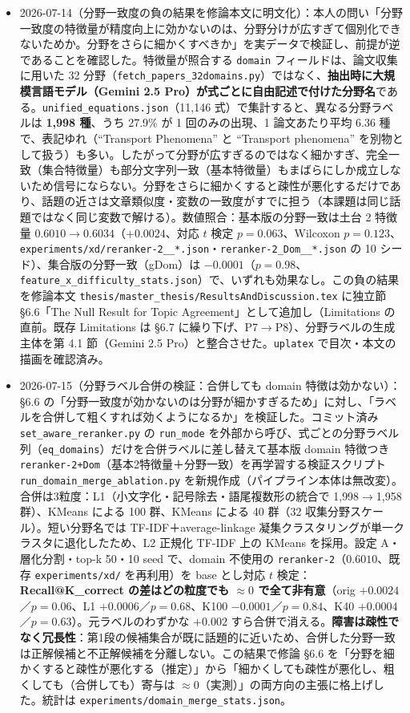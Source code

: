 \documentclass[11pt,a4paper]{jsarticle}
\begin{document}
\begin{itemize}[nosep]
  \item 2026-07-14（分野一致度の負の結果を修論本文に明文化）：本人の問い「分野一致度の特徴量が精度向上に効かないのは、分野分けが広すぎて個別化できないためか。分野をさらに細かくすべきか」を実データで検証し、前提が逆であることを確認した。特徴量が照合する \texttt{domain} フィールドは、論文収集に用いた 32 分野（\texttt{fetch\_papers\_32domains.py}）ではなく、\textbf{抽出時に大規模言語モデル（Gemini 2.5 Pro）が式ごとに自由記述で付けた分野名}である。\texttt{unified\_equations.json}（11{,}146 式）で集計すると、異なる分野ラベルは \textbf{1{,}998 種}、うち 27.9\% が 1 回のみの出現、1 論文あたり平均 6.36 種で、表記ゆれ（``Transport Phenomena'' と ``Transport phenomena'' を別物として扱う）も多い。したがって分野が広すぎるのではなく細かすぎ、完全一致（集合特徴量）も部分文字列一致（基本特徴量）もまばらにしか成立しないため信号にならない。分野をさらに細かくすると疎性が悪化するだけであり、話題の近さは文章類似度・変数の一致度がすでに担う（本課題は同じ話題ではなく同じ変数で解ける）。数値照合：基本版の分野一致は土台 2 特徴量 $0.6010 \to 0.6034$（$+0.0024$、対応 $t$ 検定 $p=0.063$、Wilcoxon $p=0.123$、\texttt{experiments/xd/reranker-2\_\_*.json}・\texttt{reranker-2\_Dom\_\_*.json} の 10 シード）、集合版の分野一致（gDom）は $-0.0001$（$p=0.98$、\texttt{feature\_x\_difficulty\_stats.json}）で、いずれも効果なし。この負の結果を修論本文 \texttt{thesis/master\_thesis/ResultsAndDiscussion.tex} に独立節 \S6.6「The Null Result for Topic Agreement」として追加し（Limitations の直前。既存 Limitations は \S6.7 に繰り下げ、P7$\to$P8）、分野ラベルの生成主体を第 4.1 節（Gemini 2.5 Pro）と整合させた。\texttt{uplatex} で目次・本文の描画を確認済み。
  \item 2026-07-15（分野ラベル合併の検証：合併しても domain 特徴は効かない）：\S6.6 の「分野一致度が効かないのは分野が細かすぎるため」に対し、「ラベルを合併して粗くすれば効くようになるか」を検証した。コミット済み \texttt{set\_aware\_reranker.py} の \texttt{run\_mode} を外部から呼び、式ごとの分野ラベル列（\texttt{eq\_domains}）だけを合併ラベルに差し替えて基本版 domain 特徴つき \texttt{reranker-2+Dom}（基本2特徴量＋分野一致）を再学習する検証スクリプト \texttt{run\_domain\_merge\_ablation.py} を新規作成（パイプライン本体は無改変）。合併は3粒度：L1（小文字化・記号除去・語尾複数形の統合で 1{,}998$\to$1{,}958 群）、KMeans による 100 群、KMeans による 40 群（32 収集分野スケール）。短い分野名では TF-IDF＋average-linkage 凝集クラスタリングが単一クラスタに退化したため、L2 正規化 TF-IDF 上の KMeans を採用。設定 A・層化分割・top-k 50・10 seed で、domain 不使用の \texttt{reranker-2}（$0.6010$、既存 \texttt{experiments/xd/} を再利用）を base とし対応 $t$ 検定：\textbf{Recall@K\_correct の差はどの粒度でも $\approx 0$ で全て非有意}（orig $+0.0024$／$p=0.06$、L1 $+0.0006$／$p=0.68$、K100 $-0.0001$／$p=0.84$、K40 $+0.0004$／$p=0.63$）。元ラベルのわずかな $+0.002$ すら合併で消える。\textbf{障害は疎性でなく冗長性}：第1段の候補集合が既に話題的に近いため、合併した分野一致は正解候補と不正解候補を分離しない。この結果で修論 \S6.6 を「分野を細かくすると疎性が悪化する（推定）」から「細かくしても疎性が悪化し、粗くしても（合併しても）寄与は $\approx 0$（実測）」の両方向の主張に格上げした。統計は \texttt{experiments/domain\_merge\_stats.json}。


\end{itemize}
\end{document}
